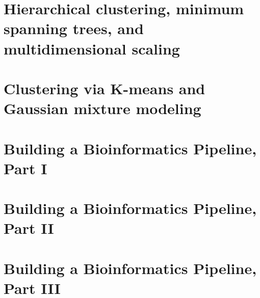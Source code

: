 \documentclass[9pt,oneside,bigheadings,tablecaptionabove]{scrbook}
\begin{document}
\chapter{Hierarchical clustering, minimum spanning trees, and multidimensional scaling}


\chapter{Clustering via K-means and Gaussian mixture modeling}


\chapter{Building a Bioinformatics Pipeline, Part I}


\chapter{Building a Bioinformatics Pipeline, Part II}


\chapter{Building a Bioinformatics Pipeline, Part III}



% 
% 
% 
% 
\end{document}
